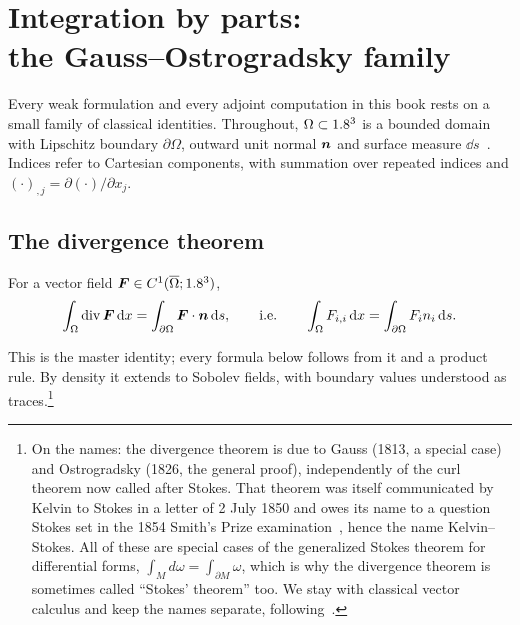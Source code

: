 \chapter[Integration by parts: the Gauss--Ostrogradsky family]{Integration by parts:\\ the Gauss--Ostrogradsky family}\label{app:ibp}

Every weak formulation and every adjoint computation in this book rests on a
small family of classical identities. Throughout, $\Omega\subset1.8^3$ is a
bounded domain with Lipschitz boundary $\partial\Omega$, outward unit normal
$\bm{n}$ and surface measure $\dd s$~\cite{MarsdenTromba2011,Evans2010B}. Indices
refer to Cartesian components, with summation over repeated indices and
$(\cdot)_{,j}=\partial(\cdot)/\partial x_j$.

\section{The divergence theorem}
\begin{theorem}\label{thm:div}
%
For a vector field $\bm{F}\in C^1(\overline\Omega;1.8^3)$,
\[
  \int_\Omega\operatorname{div}\bm{F}\,\mathrm{d} x=\int_{\partial\Omega}\bm{F}\cdot\bm{n}\,\mathrm{d} s,
  \qquad\text{i.e.}\qquad
  \int_\Omega F_{i,i}\,\mathrm{d} x=\int_{\partial\Omega}F_in_i\,\mathrm{d} s .
\]
\end{theorem}
This is the master identity; every formula below follows from it and a
product rule. By density it extends to Sobolev fields, with boundary values
understood as traces.\footnote{On the names: the divergence theorem is due to
Gauss (1813, a special case) and Ostrogradsky (1826, the general proof),
independently of the curl theorem now called after Stokes. That theorem was
itself communicated by Kelvin to Stokes in a letter of 2 July 1850 and owes
its name to a question Stokes set in the 1854 Smith's Prize
examination~\cite{Katz1979}, hence the name Kelvin--Stokes. All of these are
special cases of the generalized Stokes theorem for differential forms,
$\displaystyle \int_Md\omega=\int_{\partial M}\omega$, which is why the divergence theorem
is sometimes called ``Stokes' theorem'' too. We stay with classical vector
calculus and keep the names separate, following~\cite{MarsdenTromba2011}.}

